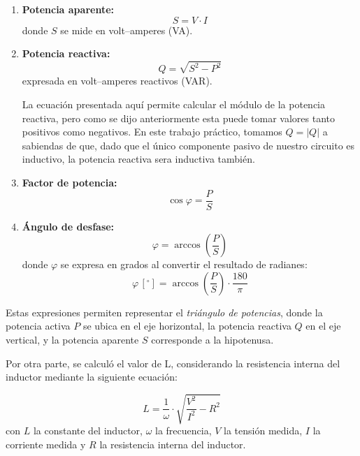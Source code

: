 \documentclass{article}
\begin{document}
            \begin{enumerate}
                \item \textbf{Potencia aparente:}
                \[
                    S = V \cdot I
                \]
                donde $S$ se mide en volt–amperes (VA).

                \item \textbf{Potencia reactiva:}
                \[
                    Q = \sqrt{S^{2} - P^{2}}
                \]
                expresada en volt–amperes reactivos (VAR). \par
                
                   La ecuación presentada aquí permite calcular el módulo de la potencia reactiva, pero como se dijo
                anteriormente esta puede tomar valores tanto positivos como negativos. En este trabajo práctico, 
                tomamos $Q=|Q|$ a sabiendas de que, dado que el único componente pasivo de nuestro circuito es inductivo, 
                la potencia reactiva sera inductiva también.

                \item \textbf{Factor de potencia:}
                \[
                    \cos \varphi = \frac{P}{S}
                \]

                \item \textbf{Ángulo de desfase:}
                \[
                    \varphi = \arccos\left( \frac{P}{S} \right)
                \]
                donde $\varphi$ se expresa en grados al convertir el resultado de 
                radianes:
                \[
                    \varphi \,[^\circ] = \arccos\left( \frac{P}{S} \right) \cdot 
                    \frac{180}{\pi}
                \]
            \end{enumerate}

                    Estas expresiones permiten representar el \textit{triángulo de potencias}, 
                    donde la potencia activa $P$ se ubica en el eje horizontal, la potencia 
                    reactiva $Q$ en el eje vertical, y la potencia aparente $S$ corresponde a 
                    la hipotenusa.\par

                Por otra parte, se calculó el valor de L, considerando la resistencia interna del inductor mediante la siguiente ecuación:

                \begin{equation*}
                    L = \frac{1}{\omega} \cdot \sqrt{\frac{V^2}{I^2}-R^2}
                \end{equation*}
                con $L$ la constante del inductor, $\omega$ la frecuencia, $V$ la tensión medida, $I$ la corriente medida y $R$ la resistencia interna del inductor. \par
                
\end{document}

